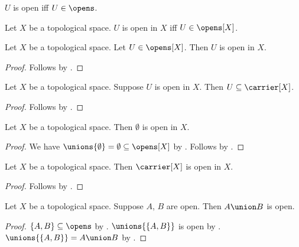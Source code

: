 \begin{abbreviation}\label{is_open_in}
    $U$ is open iff $U\in\opens$.
\end{abbreviation}

\begin{definition}\label{is_open}
    Let $X$ be a topological space.
    $U$ is open in $X$ iff $U\in\opens[X]$.
\end{definition}

\begin{classification}\label{member_of_topology_is_open}
    Let $X$ be a topological space.
    Let $U\in\opens[X]$.
    Then $U$ is open in $X$.
\end{classification}
\begin{proof}
    Follows by .
\end{proof}

\begin{classification}\label{open_subset_carrier}
    Let $X$ be a topological space.
    Suppose $U$ is open in $X$.
    Then $U\subseteq\carrier[X]$.
\end{classification}
\begin{proof}
    Follows by .
\end{proof}

\begin{classification}\label{emptyset_open}
    Let $X$ be a topological space.
    Then $\emptyset$ is open in $X$.
\end{classification}
\begin{proof}
    We have $\unions{\emptyset} = \emptyset\subseteq\opens[X]$ by .
    Follows by .
\end{proof}

\begin{classification}\label{carrier_is_open}
    Let $X$ be a topological space.
    Then $\carrier[X]$ is open in $X$.
\end{classification}
\begin{proof}
    Follows by .
\end{proof}

\begin{proposition}\label{union_open}
    Let $X$ be a topological space.
    Suppose $A$, $B$ are open.
    Then $A\union B$ is open.
\end{proposition}
\begin{proof}
    $\{A, B\}\subseteq\opens$ by .
    $\unions{\{A, B\}}$ is open by .
    $\unions{\{A, B\}}=A\union B$ by .
\end{proof}

